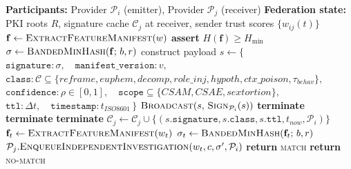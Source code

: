 \documentclass[11pt]{article}
\begin{document}
\begin{algorithm}[h]
\caption{Cross-provider handshake specified by the design under test (not evaluated as a deployed system).}
\label{alg:handshake}
\begin{algorithmic}[1]
\Statex \textbf{Participants:} Provider $\mathcal{P}_i$ (emitter), Provider $\mathcal{P}_j$ (receiver)
\Statex \textbf{Federation state:} PKI roots $R$, signature cache $\mathcal{C}_j$ at receiver, sender trust scores $\{w_{ij}(t)\}$
\Statex
{} 
    \State $\mathbf{f} \gets \textsc{ExtractFeatureManifest}(w)$ 
    \State \textbf{assert} $H(\mathbf{f}) \geq H_{\min}$ 
    \State $\sigma \gets \textsc{BandedMinHash}(\mathbf{f};\, b, r)$ 
    \State construct payload
    \Statex \quad $s \gets \big\{\,$
    \Statex \qquad $\texttt{signature} : \sigma,\quad \texttt{manifest\_version} : v,$
    \Statex \qquad $\texttt{class} : \mathcal{C} \subseteq \{\mathit{reframe}, \mathit{euphem}, \mathit{decomp}, \mathit{role\_inj}, \mathit{hypoth}, \mathit{ctx\_poison}, \tau_\mathit{behav}\},$
    \Statex \qquad $\texttt{confidence} : \rho \in [0,1],\quad \texttt{scope} \subseteq \{\mathit{CSAM}, \mathit{CSAE}, \mathit{sextortion}\},$
    \Statex \qquad $\texttt{ttl} : \Delta t,\quad \texttt{timestamp} : t_\mathit{ISO8601}\,\big\}$
    \State \Return $\textsc{Broadcast}(s,\, \textsc{Sign}_{\mathcal{P}_i}(s))$
\EndProcedure
\Statex
{}
     \textbf{terminate} \EndIf
     \textbf{terminate} \EndIf
     \textbf{terminate} \EndIf
    \State $\mathcal{C}_j \gets \mathcal{C}_j \cup \{(s.\texttt{signature}, s.\texttt{class}, s.\texttt{ttl}, t_\mathit{now}, \mathcal{P}_i)\}$
\EndProcedure
\Statex
{}
    \State $\mathbf{f}_t \gets \textsc{ExtractFeatureManifest}(w_t)$
    \State $\sigma_t \gets \textsc{BandedMinHash}(\mathbf{f}_t;\, b, r)$
            \State $\mathcal{P}_j.\textsc{EnqueueIndependentInvestigation}(w_t, c, \sigma', \mathcal{P}_i)$
            \State \textbf{return} \textsc{match}
        \EndIf
    \EndFor
    \State \textbf{return} \textsc{no-match}
\EndProcedure
\end{algorithmic}
\end{algorithm}
\end{document}
